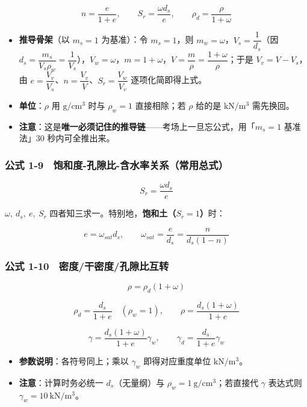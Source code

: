 \documentclass[
]{article}
\providecommand{\tightlist}{%
  \setlength{\itemsep}{0pt}\setlength{\parskip}{0pt}}
\begin{document}
\[n=\frac{e}{1+e},\qquad S_r=\frac{\omega d_s}{e},\qquad \rho_d=\frac{\rho}{1+\omega}\]

\begin{itemize}
\tightlist
\item
  \textbf{推导骨架}（以 \(m_s=1\) 为基准）：令 \(m_s=1\)，则
  \(m_w=\omega\)，\(V_s=\dfrac{1}{d_s}\)（因
  \(d_s=\dfrac{m_s}{V_s\rho_w}=\dfrac{1}{V_s}\)），\(V_w=\omega\)，\(m=1+\omega\)，\(V=\dfrac{m}{\rho}=\dfrac{1+\omega}{\rho}\)；于是
  \(V_v=V-V_s\)，由
  \(e=\dfrac{V_v}{V_s}\)、\(n=\dfrac{V_v}{V}\)、\(S_r=\dfrac{V_w}{V_v}\)
  逐项化简即得上式。
\item
  \textbf{单位}：\(\rho\) 用 \(\mathrm{g/cm^3}\) 时与 \(\rho_w=1\)
  直接相除；若 \(\rho\) 给的是 \(\mathrm{kN/m^3}\) 需先换回。
\item
  \textbf{注意}：这是\textbf{唯一必须记住的推导链}------考场上一旦忘公式，用「\(m_s=1\)
  基准法」30 秒内可全推出来。
\end{itemize}

\subsubsection{公式
1-9　饱和度-孔隙比-含水率关系（常用总式）}\label{ux516cux5f0f-1-9-ux9971ux548cux5ea6-ux5b54ux9699ux6bd4-ux542bux6c34ux7387ux5173ux7cfbux5e38ux7528ux603bux5f0f}

\[\boxed{S_r=\frac{\omega d_s}{e}}\]

\(\omega,\ d_s,\ e,\ S_r\)
四者知三求一。特别地，\textbf{饱和土（\(S_r=1\)）}时：

\[e=\omega_{sat} d_s,\qquad \omega_{sat}=\frac{e}{d_s}=\frac{n}{d_s(1-n)}\]

\subsubsection{公式
1-10　密度/干密度/孔隙比互转}\label{ux516cux5f0f-1-10-ux5bc6ux5ea6ux5e72ux5bc6ux5ea6ux5b54ux9699ux6bd4ux4e92ux8f6c}

\[\rho=\rho_d(1+\omega)\]

\[\rho_d=\frac{d_s}{1+e}\quad(\rho_w=1),\qquad \rho=\frac{d_s(1+\omega)}{1+e}\]

\[\gamma=\frac{d_s(1+\omega)}{1+e}\gamma_w,\qquad \gamma_d=\frac{d_s}{1+e}\gamma_w\]

\begin{itemize}
\tightlist
\item
  \textbf{参数说明}：各符号同上；乘以 \(\gamma_w\) 即得对应重度单位
  \(\mathrm{kN/m^3}\)。
\item
  \textbf{注意}：计算时务必统一 \(d_s\)（无量纲）与
  \(\rho_w=1\ \mathrm{g/cm^3}\)；若直接代 \(\gamma\) 表达式则
  \(\gamma_w=10\ \mathrm{kN/m^3}\)。
\end{itemize}
\end{document}
